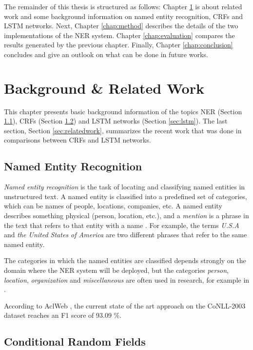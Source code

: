 \documentclass[12pt]{book}
\begin{document}
    The remainder of this thesis is structured as follows: Chapter \ref{chap:backround} is about related work and some background information on named entity recognition, CRFs and LSTM networks. Next, Chapter \ref{chap:method} describes the details of the two implementations of the NER system. Chapter \ref{chap:evaluation} compares the results generated by the previous chapter. Finally, Chapter \ref{chap:conclusion} concludes and give an outlook on what can be done in future works.
   
	\chapter{Background \& Related Work}
	\label{chap:backround}
	
	This chapter presents basic background information of the topics NER (Section \ref{sec:ner}), CRFs (Section \ref{sec:crf}) and LSTM networks (Section \ref{sec:lstm}). The last section, Section \ref{sec:relatedwork}, summarizes the recent work that was done in comparisons between CRFs and LSTM networks.

	
	\section{Named Entity Recognition}
	\label{sec:ner}
	
	\textit{Named entity recognition} is the task of locating and classifying named entities in unstructured text. A named entity is classified into a predefined set of categories, which can be names of people, locations, companies, etc. A named entity describes something physical (person, location, etc.), and a \textit{mention} is a phrase in the text that refers to that entity with a name \cite{MAL-013}. For example, the terms \textit{U.S.A} and \textit{the United States of America} are two different phrases that refer to the same named entity.
	
	The categories in which the named entities are classified depends strongly on the domain where the NER system will be deployed, but the categories \textit{person}, \textit{location}, \textit{organization} and \textit{miscellaneous} are often used in research, for example in \cite{tjongkimsang2003conll}.
	 
	According to AclWeb \cite{conll-sota}, the current state of the art approach on the CoNLL-2003 dataset reaches an F1 score of 93.09 \%.
	
	\section{Conditional Random Fields}
	\label{sec:crf}
	
\end{document}

